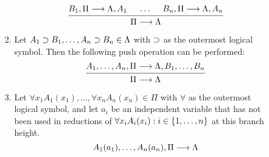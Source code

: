 \documentclass[11pt,a4paper]{article}
\begin{document}
\begin{definition}
\begin{enumerate}
\begin{enumerate}
\begin{enumerate}
                            \begin{equation}
                                \begin{prooftree}
                                    \tag{reduction:\(\limplies\):left}
                                    \label{eq:reduction:limplies:left}
                                    \hypo{B_1,\Pi\seq\Lambda,A_1}
                                    \hypo{\ldots}
                                    \hypo{B_n,\Pi\seq\Lambda, A_n}
                                    \infer3{\Pi\seq\Lambda}
                                \end{prooftree}
                            \end{equation}
                        \item\label{it:reduction tree limplies right}
                            Let \(A_1\supset B_1,\ldots,A_n\supset B_n\in\Lambda\) with
                            \(\supset\) as the outermost logical symbol.
                            Then the following push operation can be performed:
                            \begin{equation}
                                \begin{prooftree}
                                    \tag{reduction:\(\limplies\):right}
                                    \label{eq:reduction:limplies:right}
                                    \hypo{A_1,\ldots,A_n,\Pi\seq\Lambda, B_1, \ldots, B_n}
                                    \infer1{\Pi\seq\Lambda}
                                \end{prooftree}
                            \end{equation}
                        \item\label{it:reduction tree forall left}
                            Let \(\forall x_1A_1(x_1),\ldots,\forall x_nA_n(x_n)\in\Pi\)
                            with \(\forall\) as the outermost logical symbol,
                            and let \(a_i\) be an independent variable that has not been used in
                            reductions of \(\forall x_iA_i(x_i) : i \in\{1,\ldots,n\}\)
                            at this branch height.
                            \begin{equation}
                                \begin{prooftree}
                                    \tag{reduction:\(\forall\):left}
                                    \label{eq:reduction:forall:left}
                                    \hypo{A_1(a_1),\ldots,A_n(a_n),\Pi\seq\Lambda}

\end{prooftree}
\end{equation}
\end{enumerate}
\end{enumerate}
\end{enumerate}
\end{definition}
\end{document}
